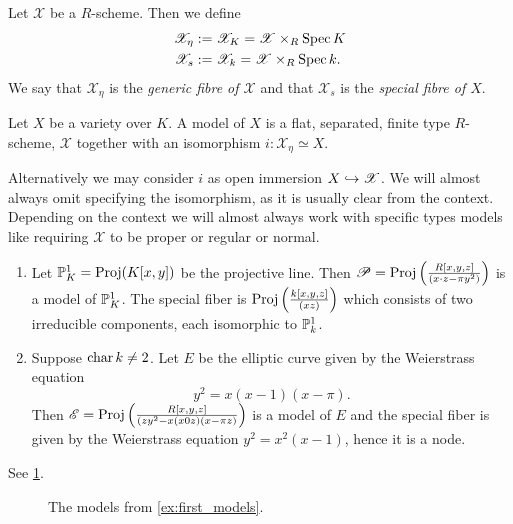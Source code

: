 \begin{definition}
	Let $\mathscr X$ be a $R$-scheme. 
	Then we define 
	\begin{align*}
		\mathscr X_\eta &:= \mathscr X_K = \mathscr X \times_R \operatorname{Spec} K \\
		\mathscr X_s &:= \mathscr X_k = \mathscr X \times_R \operatorname{Spec} k 
	.\end{align*}
	We say that $\mathscr X_\eta$ is the \emph{generic fibre of $\mathscr X$} and that $\mathscr X_s$ is the \emph{special fibre of $X$}. 
\end{definition}
\begin{definition}
	Let $X$ be a variety over $K$.  
	A model of $X$ is a flat, separated, finite type $R$-scheme, $\mathscr X$ together with an isomorphism $i: \mathscr X_\eta \simeq X$.
\end{definition}
Alternatively we may consider $i$ as open immersion $X\hookrightarrow \mathscr X$. 
We will almost always omit specifying the isomorphism, as it is usually clear from the context. 
Depending on the context we will almost always work with specific types models like requiring $\mathscr X$ to be proper or regular or normal.

\begin{example}\label{ex:first_models}
	\begin{enumerate}
		\item Let $\mathbb{P}^{1}_K = \operatorname{Proj}(K[x, y])$ be the projective line. 
			Then $\mathscr P = \operatorname{Proj}\left(\frac{R[x, y, z]}{(x\cdot z - \pi y^2)}\right)$ is a model of $\mathbb{P}^{1}_K$. 
			The special fiber is $\operatorname{Proj}\left( \frac{k[x, y, z]}{(xz)} \right) $ which consists of two irreducible components, each isomorphic to $\mathbb{P}^{1}_k$.  
		\item Suppose $\operatorname{char} k \ne 2$. Let $E$ be the elliptic curve given by the Weierstrass equation \[
				y^2 = x (x -1)(x-\pi)
		.\] 
		Then $\mathscr E = \operatorname{Proj} \left( \frac{R[x, y, z]}{(zy^2 - x(x0z)(x-\pi z)} \right) $ is a model of $E$ and the special fiber is given by the Weierstrass equation $y^2 = x^2 (x-1)$, hence it is a node. 
	\end{enumerate}
	See \cref{fig:first_examples_of_models}.
\end{example}

\begin{figure}[h]
    \centering
    \caption{The models from \cref{ex:first_models}.}
    \label{fig:first_examples_of_models}
\end{figure}

